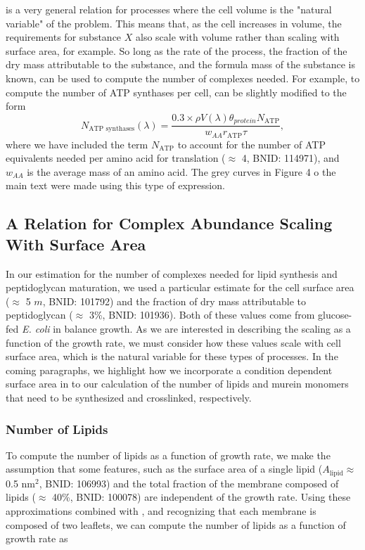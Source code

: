  is a very general relation for processes where the
cell volume is the "natural variable" of the problem. This means that, as the
cell increases in volume, the requirements for substance $X$ also scale with
volume rather than scaling with surface area, for example. So long as the rate
of the process, the fraction of the dry mass attributable to the substance, and
the formula mass of the substance is known,  can be
used to compute the number of complexes needed. For example, to compute the
number of ATP synthases per cell,  can be slightly
modified to the form
\begin{equation}
    N_\text{ATP synthases}(\lambda) = \frac{0.3 \times \rho V(\lambda)\theta_{protein}N_\text{ATP}}{w_{AA} r_\text{ATP} \tau},
\end{equation}
where we have included the term $N_\text{ATP}$ to account for the number of ATP
equivalents needed per amino acid for translation ($\approx$ 4, BNID: 114971), 
and $w_{AA}$ is the average mass of an amino acid. The grey curves in Figure 4
o the main text were made using this type of expression.

\subsection{A Relation for Complex Abundance Scaling With Surface Area}
In our estimation for the number of complexes needed for lipid synthesis and
peptidoglycan maturation, we used a particular estimate for the cell surface
area ($\approx$ 5 \textmu$m$, BNID: 101792) and the fraction of dry mass
attributable to peptidoglycan ($\approx$ 3\%, BNID: 101936). Both of these
values come from glucose-fed \textit{E. coli} in balance growth. As we are
interested in describing the scaling as a function of the growth rate, we must
consider how these values scale with cell surface area, which is the natural
variable for these types of processes. In the coming paragraphs, we highlight
how we incorporate a condition dependent surface area in to our calculation of
the number of lipids and murein monomers that need to be synthesized and
crosslinked, respectively.

\subsubsection{Number of Lipids}
To compute the number of lipids as a function of growth rate, we make the
assumption that some features, such as the surface area of a single lipid
($A_\text{lipid} \approx$ 0.5 nm$^2$, BNID: 106993) and the total fraction of the membrane 
composed of lipids ($\approx$ 40\%, BNID: 100078) are independent of the growth
rate. Using these approximations combined with , and
recognizing that each membrane is composed of two leaflets, we can
compute the number of lipids as a function of growth rate as 

